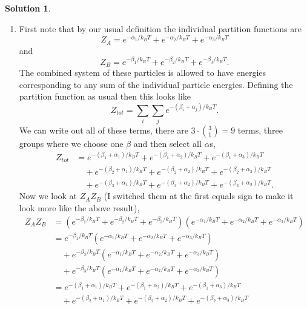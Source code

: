 \documentclass[10pt]{article}
\theoremstyle{definition}
\newtheorem{soln}{Solution}
\begin{document}
\begin{soln}~
  \begin{enumerate}[label=(\alph*)]
    \item First note that by our usual definition the individual partition functions are
          $$Z_A=e^{-\alpha_1/k_BT}+e^{-\alpha_2/k_BT}+e^{-\alpha_3/k_BT}$$
          and
          $$Z_B=e^{-\beta_1/k_BT}+e^{-\beta_2/k_BT}+e^{-\beta_3/k_BT}.$$
          The combined system of these particles is allowed to have energies corresponding to any sum of the individual particle energies.
          Defining the partition function as usual then this looks like
          $$Z_{tot}=\sum_i\sum_je^{-(\beta_i+\alpha_j)/k_BT}.$$
          We can write out all of these terms, there are $3\cdot \binom{3}{1}=9$ terms, three groups where we choose one $\beta$ and then select all $\alpha$s,
          \begin{align*}
            Z_{tot} & =e^{-(\beta_1+\alpha_1)/k_BT}+e^{-(\beta_1+\alpha_2)/k_BT}+e^{-(\beta_1+\alpha_3)/k_BT}       \\
                    & \quad+e^{-(\beta_2+\alpha_1)/k_BT}+e^{-(\beta_2+\alpha_2)/k_BT}+e^{-(\beta_2+\alpha_3)/k_BT}  \\
                    & \quad+e^{-(\beta_3+\alpha_1)/k_BT}+e^{-(\beta_3+\alpha_2)/k_BT}+e^{-(\beta_3+\alpha_3)/k_BT}.
          \end{align*}
          Now we look at $Z_AZ_B$ (I switched them at the first equals sign to make it look more like the above result),
          \begin{align*}
            Z_AZ_B & =(e^{-\beta_1/k_BT}+e^{-\beta_2/k_BT}+e^{-\beta_3/k_BT})(e^{-\alpha_1/k_BT}+e^{-\alpha_2/k_BT}+e^{-\alpha_3/k_BT}) \\
                   & =e^{-\beta_1/k_BT}(e^{-\alpha_1/k_BT}+e^{-\alpha_2/k_BT}+e^{-\alpha_3/k_BT})                                       \\
                   & \quad+e^{-\beta_2/k_BT}(e^{-\alpha_1/k_BT}+e^{-\alpha_2/k_BT}+e^{-\alpha_3/k_BT})                                  \\
                   & \quad+e^{-\beta_3/k_BT}(e^{-\alpha_1/k_BT}+e^{-\alpha_2/k_BT}+e^{-\alpha_3/k_BT})                                  \\
                   & =e^{-(\beta_1+\alpha_1)/k_BT}+e^{-(\beta_1+\alpha_2)/k_BT}+e^{-(\beta_1+\alpha_3)/k_BT}                            \\
                   & \quad+e^{-(\beta_2+\alpha_1)/k_BT}+e^{-(\beta_2+\alpha_2)/k_BT}+e^{-(\beta_2+\alpha_3)/k_BT}                       \\

\end{align*}
\end{enumerate}
\end{soln}
\end{document}
